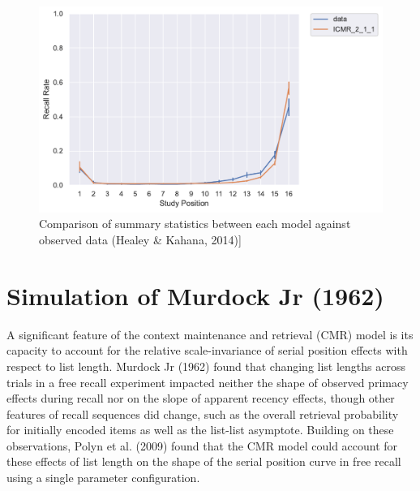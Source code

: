 \documentclass[
  letterpaper,
  DIV=11,
  numbers=noendperiod]{scrreport}
\begin{document}
\begin{figure}
\begin{minipage}[c]{0.33\linewidth}
{}

\end{minipage}%
%
\begin{minipage}[c]{0.33\linewidth}

{\centering 

\includegraphics{./figures/HealyKahana2014_ICMR_2_1_1_ll16_pfr.pdf}

}

\end{minipage}%

\caption{\label{fig-HealeyKahana2014Summary}Comparison of summary
statistics between each model against observed data (Healey \& Kahana,
2014){]}}

\end{figure}


\hypertarget{simulation-of-murdock-jr-1962}{%
\chapter{Simulation of Murdock Jr
(1962)}\label{simulation-of-murdock-jr-1962}}

A significant feature of the context maintenance and retrieval (CMR)
model is its capacity to account for the relative scale-invariance of
serial position effects with respect to list length. Murdock Jr (1962)
found that changing list lengths across trials in a free recall
experiment impacted neither the shape of observed primacy effects during
recall nor on the slope of apparent recency effects, though other
features of recall sequences did change, such as the overall retrieval
probability for initially encoded items as well as the list-list
asymptote. Building on these observations, Polyn et al. (2009) found
that the CMR model could account for these effects of list length on the
shape of the serial position curve in free recall using a single
parameter configuration.
\end{document}
